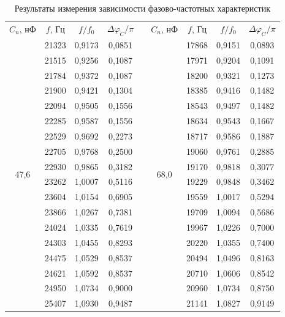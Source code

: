 \documentclass[a4paper, 12pt]{article}
\begin{document}
    \begin{table}[H]
        \centering
        \begin{tabular}{|c|c|c|c|c|c|c|c|c|}
        \cline{1-4} \cline{6-9}
        $C_n$, нФ & $f$, Гц & $f/f_0$ & $\Delta \varphi_C /\pi$ & \multirow{19}{*}{} & $C_n$, нФ & $f$, Гц & $f/f_0$ & $\Delta \varphi_C /\pi$ \\ \cline{1-4} \cline{6-9} 
        \multirow{18}{*}{47,6} & 21323 & 0,9173 & 0,0851 &  & \multirow{18}{*}{68,0} & 17868 & 0,9151 & 0,0893 \\ \cline{2-4} \cline{7-9} 
         & 21515 & 0,9256 & 0,1087 &  &  & 17971 & 0,9204 & 0,1091 \\ \cline{2-4} \cline{7-9} 
         & 21784 & 0,9372 & 0,1087 &  &  & 18200 & 0,9321 & 0,1273 \\ \cline{2-4} \cline{7-9} 
         & 21900 & 0,9421 & 0,1304 &  &  & 18385 & 0,9416 & 0,1482 \\ \cline{2-4} \cline{7-9} 
         & 22094 & 0,9505 & 0,1556 &  &  & 18543 & 0,9497 & 0,1482 \\ \cline{2-4} \cline{7-9} 
         & 22285 & 0,9587 & 0,1556 &  &  & 18634 & 0,9543 & 0,1667 \\ \cline{2-4} \cline{7-9} 
         & 22529 & 0,9692 & 0,2273 &  &  & 18717 & 0,9586 & 0,1887 \\ \cline{2-4} \cline{7-9} 
         & 22705 & 0,9768 & 0,2500 &  &  & 19060 & 0,9761 & 0,2885 \\ \cline{2-4} \cline{7-9} 
         & 22930 & 0,9865 & 0,3182 &  &  & 19170 & 0,9818 & 0,3077 \\ \cline{2-4} \cline{7-9} 
         & 23262 & 1,0007 & 0,5116 &  &  & 19229 & 0,9848 & 0,3462 \\ \cline{2-4} \cline{7-9} 
         & 23604 & 1,0154 & 0,6905 &  &  & 19559 & 1,0017 & 0,5294 \\ \cline{2-4} \cline{7-9} 
         & 23866 & 1,0267 & 0,7381 &  &  & 19709 & 1,0094 & 0,5686 \\ \cline{2-4} \cline{7-9} 
         & 24024 & 1,0335 & 0,7619 &  &  & 19967 & 1,0226 & 0,7000 \\ \cline{2-4} \cline{7-9} 
         & 24303 & 1,0455 & 0,8293 &  &  & 20220 & 1,0355 & 0,7400 \\ \cline{2-4} \cline{7-9} 
         & 24475 & 1,0529 & 0,8537 &  &  & 20494 & 1,0496 & 0,8163 \\ \cline{2-4} \cline{7-9} 
         & 24621 & 1,0592 & 0,8537 &  &  & 20710 & 1,0606 & 0,8542 \\ \cline{2-4} \cline{7-9} 
         & 24950 & 1,0734 & 0,9000 &  &  & 20960 & 1,0734 & 0,8750 \\ \cline{2-4} \cline{7-9} 
         & 25407 & 1,0930 & 0,9487 &  &  & 21141 & 1,0827 & 0,9149 \\ \cline{1-4} \cline{6-9} 
        \end{tabular}
        \caption{Результаты измерения зависимости фазово-частотных характеристик}
        \label{tab:res_PFC}
    \end{table}
\end{document}
